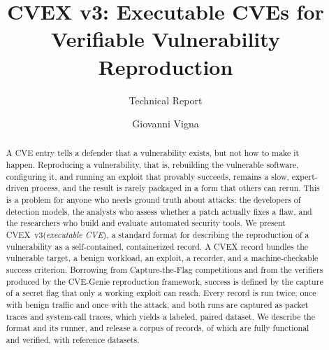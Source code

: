 \documentclass[sigconf,nonacm]{acmart}
\newcommand{\cvex}{CVEX\xspace}
\newcommand{\cvexthree}{CVEX~v3\xspace}
\newcommand{\genie}{CVE-Genie\xspace}
\begin{document}
\title{CVEX v3: Executable CVEs for Verifiable Vulnerability Reproduction}
\subtitle{Technical Report}

\author{Giovanni Vigna}

\begin{abstract}
A CVE entry tells a defender that a vulnerability exists, but not how to
make it happen. Reproducing a vulnerability, that is, rebuilding the
vulnerable software, configuring it, and running an exploit that provably
succeeds, remains a slow, expert-driven process, and the result is rarely
packaged in a form that others can rerun. This is a problem for anyone who
needs ground truth about attacks: the developers of detection models, the
analysts who assess whether a patch actually fixes a flaw, and the
researchers who build and evaluate automated security tools. We present
\cvexthree (\emph{executable CVE}), a standard format for describing the
reproduction of a vulnerability as a self-contained, containerized record.
A \cvex record bundles the vulnerable target, a benign workload, an
exploit, a recorder, and a machine-checkable success criterion. Borrowing
from Capture-the-Flag competitions and from the verifiers produced by the
\genie reproduction framework, success is defined by the capture of a
secret flag that only a working exploit can reach. Every record is run
twice, once with benign traffic and once with the attack, and both runs are
captured as packet traces and system-call traces, which yields a labeled,
paired dataset. We describe the format and its runner, and release a
corpus of \NumRecords records, \NumFunctional of which are fully functional and
verified, with reference datasets.
\end{abstract}


\maketitle











\end{document}
